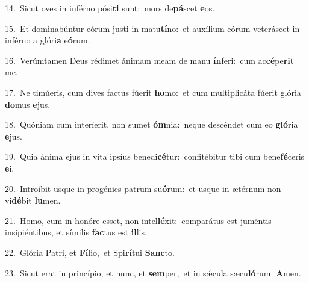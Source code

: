 {\numbfont\textcolor{\numbcolor}{14.}}~Sicut oves in inférno pósi\textbf{ti} sunt:~\star mors de\-\textbf{pá}\-scet \textbf{e}\-os.\par
{\numbfont\textcolor{\numbcolor}{15.}}~Et dominabúntur eórum justi in matu\-\textbf{tí}\-no:~\star et auxílium eórum veteráscet in inférno a glóri\textbf{a} e\-\textbf{ó}\-rum.\par
{\numbfont\textcolor{\numbcolor}{16.}}~Verúmtamen Deus rédimet ánimam meam de manu \textbf{ín}\-feri:~\star cum ac\-\textbf{cé}\-pe\textbf{rit} me.\par
{\numbfont\textcolor{\numbcolor}{17.}}~Ne timúeris, cum dives factus fúerit \textbf{ho}\-mo:~\star et cum multiplicáta fúerit glória \textbf{do}\-mus \textbf{e}\-jus.\par
{\numbfont\textcolor{\numbcolor}{18.}}~Quóniam cum interíerit, non sumet \textbf{óm}\-nia:~\star neque descéndet cum eo \textbf{gló}\-ria \textbf{e}\-jus.\par
{\numbfont\textcolor{\numbcolor}{19.}}~Quia ánima ejus in vita ipsíus benedi\-\textbf{cé}\-tur:~\star confitébitur tibi cum bene\-\textbf{fé}\-ceris \textbf{e}\-i.\par
{\numbfont\textcolor{\numbcolor}{20.}}~Introíbit usque in progénies patrum su\-\textbf{ó}\-rum:~\star et usque in ætérnum non vi\-\textbf{dé}\-bit \textbf{lu}\-men.\par
{\numbfont\textcolor{\numbcolor}{21.}}~Homo, cum in honóre esset, non intel\-\textbf{lé}\-xit:~\star comparátus est juméntis insipiéntibus, et símilis \textbf{fac}\-tus est \textbf{il}\-lis.\par
{\numbfont\textcolor{\numbcolor}{22.}}~Glória Patri, et \textbf{Fí}\-lio,~\star et Spi\-\textbf{rí}\-tui \textbf{Sanc}\-to.\par
{\numbfont\textcolor{\numbcolor}{23.}}~Sicut erat in princípio, et nunc, et \textbf{sem}\-per,~\star et in sǽcula sæcu\-\textbf{ló}\-rum. \textbf{A}\-men.\par
